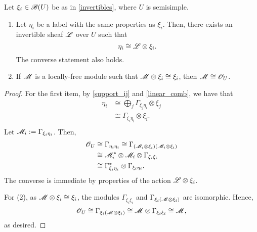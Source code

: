\begin{proposition}\label{uniqueness_labels}
Let $\xi_i\in \mathscr{B}(U)$ be as in \ref{invertibles}, where $U$ is semisimple.
\begin{enumerate}[(1)]
\item Let $\eta_i$ be a label with the same properties as $\xi_i$. Then, there exists an invertible sheaf $\mathscr{L}$ over $U$ such that
$$\eta_i\cong \mathscr{L}\otimes \xi_i.$$
The converse statement also holds.
\item If $\mathscr{M}$ is a locally-free module such that $\mathscr{M}\otimes \xi_i\cong \xi_i$, then $\mathscr{M}\cong \mathscr{O}_U$.
\end{enumerate}
\end{proposition}
\begin{proof}
For the first item, by \ref{support_ij} and \ref{linear_comb}, we have that
$$
\begin{aligned}
\eta_i &\cong \bigoplus_j\Gamma_{\xi_j\eta_i}\otimes \xi_j \\
       &\cong \Gamma_{\xi_i\eta_i}\otimes \xi_i. \\
\end{aligned}
$$
Let $\mathscr{M}_i:=\Gamma_{\xi_i\eta_i}$. Then,
$$
\begin{aligned}
\mathscr{O}_U &\cong \Gamma_{\eta_i\eta_i} \cong \Gamma_{\left (\mathscr{M}_i\otimes \xi_i \right )\left (\mathscr{M}_i\otimes \xi_i \right )} \\
          &\cong \mathscr{M}_i^*\otimes \mathscr{M}_i\otimes \Gamma_{\xi_i\xi_i} \\
					&\cong \Gamma_{\xi_i\eta_i}^*\otimes \Gamma_{\xi_i\eta_i}.\\
\end{aligned}
$$
The converse is immediate by properties of the action $\mathscr{L}\otimes \xi_i$.

For (2), as $\mathscr{M}\otimes \xi_i \cong \xi_i$, the modules $\Gamma_{\xi_i\xi_i}$ and $\Gamma_{\xi_i\left (\mathscr{M}\otimes \xi_i\right )}$ are isomorphic. Hence,
$$\mathscr{O}_U\cong \Gamma_{\xi_i\left (\mathscr{M}\otimes \xi_i\right )}\cong \mathscr{M}\otimes \Gamma_{\xi_i\xi_i}\cong \mathscr{M},$$
as desired.
\end{proof}

